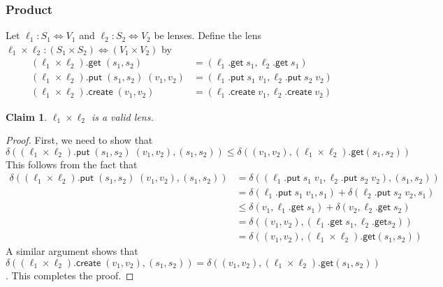 \documentclass[acmsmall,review,anonymous]{acmart}\settopmatter{printfolios=true,printccs=false,printacmref=false}
\newtheorem{claim}{Claim}
\newcommand{\kw}[1]{\ensuremath{\mathsf{#1}}}
\newcommand{\get}{\ensuremath{\kw{get}}}
\newcommand{\pput}{\ensuremath{\kw{put}}}
\newcommand{\create}{\ensuremath{\kw{create}}}
\begin{document}
\subsubsection{Product}
Let $\ell_1 : S_1 \Leftrightarrow V_1$ and $\ell_2 : S_2 \Leftrightarrow V_2$ be
lenses. Define the lens $\ell_1 \times \ell_2 : (S_1 \times S_2) \Leftrightarrow
(V_1 \times V_2)$ by
\begin{align*}
(\ell_1 \times \ell_2).\get \; (s_1, s_2) &= (\ell_1.\get \; s_1, \ell_2.\get
\; s_1)\\
(\ell_1 \times \ell_2).\pput \; (s_1, s_2) \; (v_1, v_2) &= (\ell_1.\pput \; s_1
\; v_1, \ell_2.\pput \; s_2 \; v_2)\\
(\ell_1 \times \ell_2).\create \; (v_1, v_2) &= (\ell_1.\create \; v_1,
\ell_2.\create \; v_2)
\end{align*}
\begin{claim}
$\ell_1 \times \ell_2$ is a valid lens.
\end{claim}
\begin{proof}
First, we need to show that
$$\delta((\ell_1 \times \ell_2).\pput \; (s_1, s_2) \; (v_1, v_2), (s_1, s_2))
\leq \delta((v_1, v_2), (\ell_1 \times \ell_2).\get (s_1, s_2))$$ This follows
from the fact that
\begin{align*}
\delta((\ell_1 \times \ell_2).\pput \; (s_1, s_2) \; (v_1, v_2), (s_1, s_2)) &=
\delta((\ell_1.\pput \; s_1\; v_1, \ell_2.\pput \; s_2 \; v_2), (s_1, s_2))\\
&= \delta (\ell_1.\pput \; s_1\; v_1, s_1) + \delta (\ell_2.\pput \; s_2 \;
v_2, s_1)\\
&\leq \delta(v_1, \ell_1.\get \; s_1) + \delta(v_2, \ell_2.\get \; s_2)\\
&=\delta((v_1, v_2), (\ell_1.\get \; s_1, \ell_2.\get s_2))\\
&= \delta((v_1, v_2), (\ell_1 \times \ell_2).\get (s_1, s_2))
\end{align*}
A similar argument shows that $\delta((\ell_1 \times \ell_2).\create \; (v_1,
v_2), (s_1, s_2)) = \delta((v_1, v_2), (\ell_1 \times \ell_2).\get (s_1, s_2))$.
This completes the proof.
\end{proof}
\end{document}
